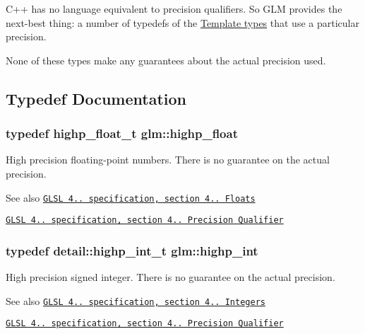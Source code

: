 C++ has no language equivalent to precision qualifiers. So G\+L\+M provides the next-\/best thing\+: a number of typedefs of the \hyperlink{group__core__template}{Template types} that use a particular precision.

None of these types make any guarantees about the actual precision used. 

\subsection{Typedef Documentation}
\hypertarget{group__core__precision_ga3d443a093adc053638ed7f81c5bfe300}{}
\subsubsection[{highp\+\_\+float}]{\setlength{\rightskip}{0pt plus 5cm}typedef highp\+\_\+float\+\_\+t {\bf glm\+::highp\+\_\+float}}\label{group__core__precision_ga3d443a093adc053638ed7f81c5bfe300}
High precision floating-\/point numbers. There is no guarantee on the actual precision.

\begin{DoxySeeAlso}{See also}
\href{http://www.opengl.org/registry/doc/GLSLangSpec.4.20.8.pdf}{\tt G\+L\+S\+L 4.. specification, section 4.. Floats} 

\href{http://www.opengl.org/registry/doc/GLSLangSpec.4.20.8.pdf}{\tt G\+L\+S\+L 4.. specification, section 4.. Precision Qualifier} 
\end{DoxySeeAlso}
\hypertarget{group__core__precision_gaafed5240eb0a43328cb75faf5fb0a8c2}{}
\subsubsection[{highp\+\_\+int}]{\setlength{\rightskip}{0pt plus 5cm}typedef detail\+::highp\+\_\+int\+\_\+t {\bf glm\+::highp\+\_\+int}}\label{group__core__precision_gaafed5240eb0a43328cb75faf5fb0a8c2}
High precision signed integer. There is no guarantee on the actual precision.

\begin{DoxySeeAlso}{See also}
\href{http://www.opengl.org/registry/doc/GLSLangSpec.4.20.8.pdf}{\tt G\+L\+S\+L 4.. specification, section 4.. Integers} 

\href{http://www.opengl.org/registry/doc/GLSLangSpec.4.20.8.pdf}{\tt G\+L\+S\+L 4.. specification, section 4.. Precision Qualifier} 
\end{DoxySeeAlso}
\hypertarget{group__core__precision_ga83738eb062e2e6b5e52cd0461da9c742}{}
